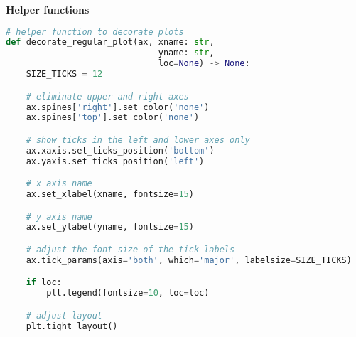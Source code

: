 {\noindent\hspace{-12.5pt}\normalsize\bfseries Helper functions}\vspace{-10pt}
\begin{center}
  \begin{lstlisting}[language=Python]
# helper function to decorate plots
def decorate_regular_plot(ax, xname: str, 
                              yname: str, 
                              loc=None) -> None:
    SIZE_TICKS = 12

    # eliminate upper and right axes
    ax.spines['right'].set_color('none')
    ax.spines['top'].set_color('none')

    # show ticks in the left and lower axes only
    ax.xaxis.set_ticks_position('bottom')
    ax.yaxis.set_ticks_position('left')

    # x axis name
    ax.set_xlabel(xname, fontsize=15)

    # y axis name
    ax.set_ylabel(yname, fontsize=15)

    # adjust the font size of the tick labels
    ax.tick_params(axis='both', which='major', labelsize=SIZE_TICKS)

    if loc:
        plt.legend(fontsize=10, loc=loc)

    # adjust layout
    plt.tight_layout()
  \end{lstlisting}
\end{center}


